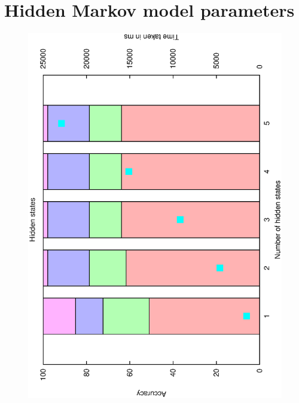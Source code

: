 \documentclass[12pt,a4,notitlepage]{report}
\renewcommand{\_}{\texttt{\symbol{95}}}
\newcommand{\<}{\texttt{\symbol{60}}}
\renewcommand{\>}{\texttt{\symbol{62}}}
\begin{document}
\section{Hidden Markov model parameters}
\begin{figure}
\centering
\includegraphics[scale=0.3,angle=-90]{results/markov/m_hidden_states.ps}

\end{figure}
\end{document}
